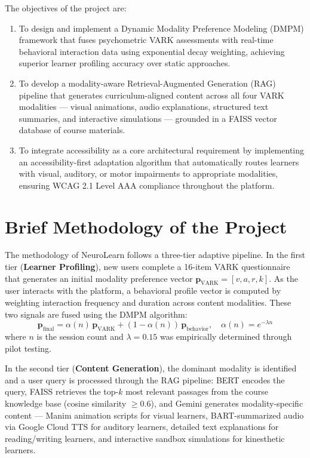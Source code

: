The objectives of the project are:
\begin{enumerate}
	\item To design and implement a Dynamic Modality Preference Modeling (DMPM) framework that fuses psychometric VARK assessments with real-time behavioral interaction data using exponential decay weighting, achieving superior learner profiling accuracy over static approaches.
	\item To develop a modality-aware Retrieval-Augmented Generation (RAG) pipeline that generates curriculum-aligned content across all four VARK modalities --- visual animations, audio explanations, structured text summaries, and interactive simulations --- grounded in a FAISS vector database of course materials.
	\item To integrate accessibility as a core architectural requirement by implementing an accessibility-first adaptation algorithm that automatically routes learners with visual, auditory, or motor impairments to appropriate modalities, ensuring WCAG 2.1 Level AAA compliance throughout the platform.
\end{enumerate}

\section[Brief Methodology of the Project]{\textbf{Brief Methodology of the Project}}

The methodology of NeuroLearn follows a three-tier adaptive pipeline. In the first tier (\textbf{Learner Profiling}), new users complete a 16-item VARK questionnaire that generates an initial modality preference vector $\mathbf{p}_{\text{VARK}} = [v, a, r, k]$. As the user interacts with the platform, a behavioral profile vector is computed by weighting interaction frequency and duration across content modalities. These two signals are fused using the DMPM algorithm:
\[
\mathbf{p}_{\text{final}} = \alpha(n)\,\mathbf{p}_{\text{VARK}} + (1 - \alpha(n))\,\mathbf{p}_{\text{behavior}}, \quad \alpha(n) = e^{-\lambda n}
\]
where $n$ is the session count and $\lambda = 0.15$ was empirically determined through pilot testing.

In the second tier (\textbf{Content Generation}), the dominant modality is identified and a user query is processed through the RAG pipeline: BERT encodes the query, FAISS retrieves the top-$k$ most relevant passages from the course knowledge base (cosine similarity $\geq 0.6$), and Gemini generates modality-specific content --- Manim animation scripts for visual learners, BART-summarized audio via Google Cloud TTS for auditory learners, detailed text explanations for reading/writing learners, and interactive sandbox simulations for kinesthetic learners.


